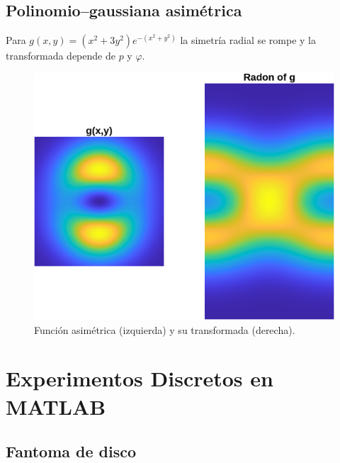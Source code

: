 \documentclass[11pt]{article}
\begin{document}
\subsection{Polinomio–gaussiana asimétrica}

Para $g(x,y)=(x^{2}+3y^{2})e^{-(x^{2}+y^{2})}$ la simetría radial se
rompe y la transformada depende de $p$ y $\varphi$.

\begin{figure}[H]
\centering
\includegraphics[width=\textwidth]{figures/asymmetric_function_and_radon.png}
\caption{Función asimétrica (izquierda) y su transformada (derecha).}
\label{fig:asymmetric}
\end{figure}
\FloatBarrier

\section{Experimentos Discretos en MATLAB}

\subsection{Fantoma de disco}
\end{document}
